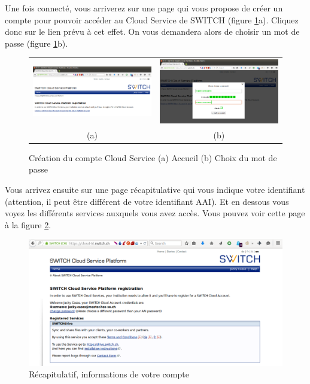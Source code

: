 Une fois connecté, vous arriverez sur une page qui vous propose de créer un compte pour pouvoir accéder au Cloud Service de SWITCH (figure \ref{loginEngines}a). Cliquez donc sur le lien prévu à cet effet. On vous demandera alors de choisir un mot de passe (figure \ref{loginEngines}b).

\begin{figure}[h!]
    \centering
    \begin{tabular}{cc}
      \includegraphics[width=.48\linewidth]{img/switch3.png} &
      \includegraphics[width=.48\linewidth]{img/switch4.png} \\
      (a) & (b)\\
    \end{tabular}
    \caption{Création du compte Cloud Service (a) Accueil (b) Choix du mot de passe
    \label{loginEngines}}
\end{figure}

Vous arrivez ensuite sur une page récapitulative qui vous indique votre identifiant (attention, il peut être différent de votre identifiant AAI). Et en dessous vous voyez les différents services auxquels vous avez accès. Vous pouvez voir cette page à la figure \ref{enginesRecap}.

\begin{figure}[h]
  \centering
    \includegraphics[width=\linewidth]{img/switch5.png}
  \caption{Récapitulatif, informations de votre compte}
  \label{enginesRecap}
\end{figure}

